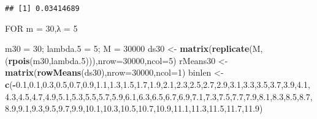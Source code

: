 \documentclass[
]{article}
\newenvironment{Shaded}{\begin{snugshade}}{\end{snugshade}}
\newcommand{\DataTypeTok}[1]{\textcolor[rgb]{0.13,0.29,0.53}{#1}}
\newcommand{\DecValTok}[1]{\textcolor[rgb]{0.00,0.00,0.81}{#1}}
\newcommand{\FloatTok}[1]{\textcolor[rgb]{0.00,0.00,0.81}{#1}}
\newcommand{\KeywordTok}[1]{\textcolor[rgb]{0.13,0.29,0.53}{\textbf{#1}}}
\newcommand{\NormalTok}[1]{#1}
\newcommand{\OperatorTok}[1]{\textcolor[rgb]{0.81,0.36,0.00}{\textbf{#1}}}
\newcommand{\StringTok}[1]{\textcolor[rgb]{0.31,0.60,0.02}{#1}}
\begin{document}
\begin{verbatim}
## [1] 0.03414689
\end{verbatim}

FOR m = 30,λ = 5

\begin{Shaded}
\begin{Highlighting}[]
\NormalTok{m30 =}\StringTok{ }\DecValTok{30}\NormalTok{; lambda}\FloatTok{.5}\NormalTok{ =}\StringTok{ }\DecValTok{5}\NormalTok{; M =}\StringTok{ }\DecValTok{30000}
\NormalTok{ds30 <-}\StringTok{ }\KeywordTok{matrix}\NormalTok{(}\KeywordTok{replicate}\NormalTok{(M,(}\KeywordTok{rpois}\NormalTok{(m30,lambda}\FloatTok{.5}\NormalTok{))),}\DataTypeTok{nrow=}\DecValTok{30000}\NormalTok{,}\DataTypeTok{ncol=}\DecValTok{5}\NormalTok{)}
\NormalTok{rMeans30 <-}\StringTok{ }\KeywordTok{matrix}\NormalTok{(}\KeywordTok{rowMeans}\NormalTok{(ds30),}\DataTypeTok{nrow=}\DecValTok{30000}\NormalTok{,}\DataTypeTok{ncol=}\DecValTok{1}\NormalTok{)}
\NormalTok{binlen <-}\StringTok{ }\KeywordTok{c}\NormalTok{(}\OperatorTok{-}\FloatTok{0.1}\NormalTok{,}\FloatTok{0.1}\NormalTok{,}\FloatTok{0.3}\NormalTok{,}\FloatTok{0.5}\NormalTok{,}\FloatTok{0.7}\NormalTok{,}\FloatTok{0.9}\NormalTok{,}\FloatTok{1.1}\NormalTok{,}\FloatTok{1.3}\NormalTok{,}\FloatTok{1.5}\NormalTok{,}\FloatTok{1.7}\NormalTok{,}\FloatTok{1.9}\NormalTok{,}\FloatTok{2.1}\NormalTok{,}\FloatTok{2.3}\NormalTok{,}\FloatTok{2.5}\NormalTok{,}\FloatTok{2.7}\NormalTok{,}\FloatTok{2.9}\NormalTok{,}\FloatTok{3.1}\NormalTok{,}\FloatTok{3.3}\NormalTok{,}\FloatTok{3.5}\NormalTok{,}\FloatTok{3.7}\NormalTok{,}\FloatTok{3.9}\NormalTok{,}\FloatTok{4.1}\NormalTok{,}\FloatTok{4.3}\NormalTok{,}\FloatTok{4.5}\NormalTok{,}\FloatTok{4.7}\NormalTok{,}\FloatTok{4.9}\NormalTok{,}\FloatTok{5.1}\NormalTok{,}\FloatTok{5.3}\NormalTok{,}\FloatTok{5.5}\NormalTok{,}\FloatTok{5.7}\NormalTok{,}\FloatTok{5.9}\NormalTok{,}\FloatTok{6.1}\NormalTok{,}\FloatTok{6.3}\NormalTok{,}\FloatTok{6.5}\NormalTok{,}\FloatTok{6.7}\NormalTok{,}\FloatTok{6.9}\NormalTok{,}\FloatTok{7.1}\NormalTok{,}\FloatTok{7.3}\NormalTok{,}\FloatTok{7.5}\NormalTok{,}\FloatTok{7.7}\NormalTok{,}\FloatTok{7.9}\NormalTok{,}\FloatTok{8.1}\NormalTok{,}\FloatTok{8.3}\NormalTok{,}\FloatTok{8.5}\NormalTok{,}\FloatTok{8.7}\NormalTok{,}\FloatTok{8.9}\NormalTok{,}\FloatTok{9.1}\NormalTok{,}\FloatTok{9.3}\NormalTok{,}\FloatTok{9.5}\NormalTok{,}\FloatTok{9.7}\NormalTok{,}\FloatTok{9.9}\NormalTok{,}\FloatTok{10.1}\NormalTok{,}\FloatTok{10.3}\NormalTok{,}\FloatTok{10.5}\NormalTok{,}\FloatTok{10.7}\NormalTok{,}\FloatTok{10.9}\NormalTok{,}\FloatTok{11.1}\NormalTok{,}\FloatTok{11.3}\NormalTok{,}\FloatTok{11.5}\NormalTok{,}\FloatTok{11.7}\NormalTok{,}\FloatTok{11.9}\NormalTok{)}

\end{Highlighting}
\end{Shaded}
\end{document}
